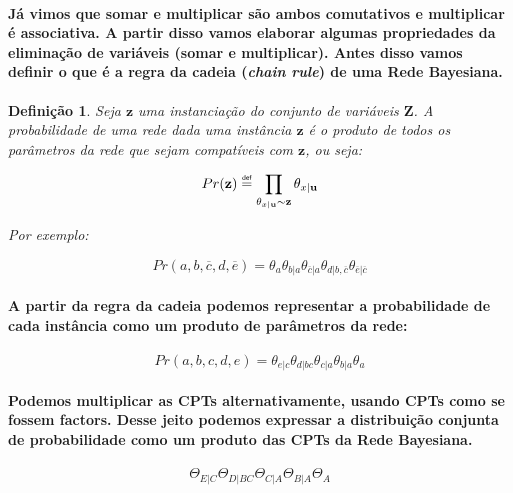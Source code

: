 \documentclass[a4paper,10pt]{article}
\newcommand\defeq{\mathrel{\overset{\makebox[0pt]{\mbox{\normalfont\tiny\sffamily def}}}{=}}}
\theoremstyle{plain}
\newtheorem*{spn-def}{Definição}
\begin{document}
\paragraph{
  Já vimos que somar e multiplicar são ambos comutativos e multiplicar é associativa. A partir 
disso vamos elaborar algumas propriedades da eliminação de variáveis (somar e multiplicar). Antes
disso vamos definir o que é a regra da cadeia (\textit{chain rule}) de uma Rede Bayesiana.
}

\begin{spn-def} Seja $\textbf{z}$ uma instanciação do conjunto de variáveis $\textbf{Z}$. A 
  probabilidade de uma rede dada uma instância $\textbf{z}$ é o produto de todos os parâmetros da
  rede que sejam compatíveis com $\textbf{z}$, ou seja:
  
  \begin{equation}
    Pr(\textbf{z}) \defeq \prod_{\theta_{x|\textbf{u}} \sim \textbf{z}} \theta_{x|\textbf{u}}
  \end{equation}

  Por exemplo:

  \begin{equation}
    Pr(a, b, \overline{c}, d, \overline{e}) = \theta_a \theta_{b|a} \theta_{\overline{c}|a} 
      \theta_{d|b,\overline{c}} \theta_{\overline{e}|\overline{c}}
  \end{equation}
\end{spn-def}

\paragraph{
  A partir da regra da cadeia podemos representar a probabilidade de cada instância como um
produto de parâmetros da rede:
}

\begin{equation}
  Pr(a, b, c, d, e) = \theta_{e|c} \theta_{d|bc} \theta_{c|a} \theta_{b|a} \theta_a
\end{equation}

\paragraph{
  Podemos multiplicar as CPTs\cite{report-1} alternativamente, usando CPTs como se fossem factors.
Desse jeito podemos expressar a distribuição conjunta de probabilidade como um produto das CPTs da
Rede Bayesiana.
}

\begin{equation}
  \Theta_{E|C} \Theta_{D|BC} \Theta_{C|A} \Theta_{B|A} \Theta_A
\end{equation}
\end{document}
